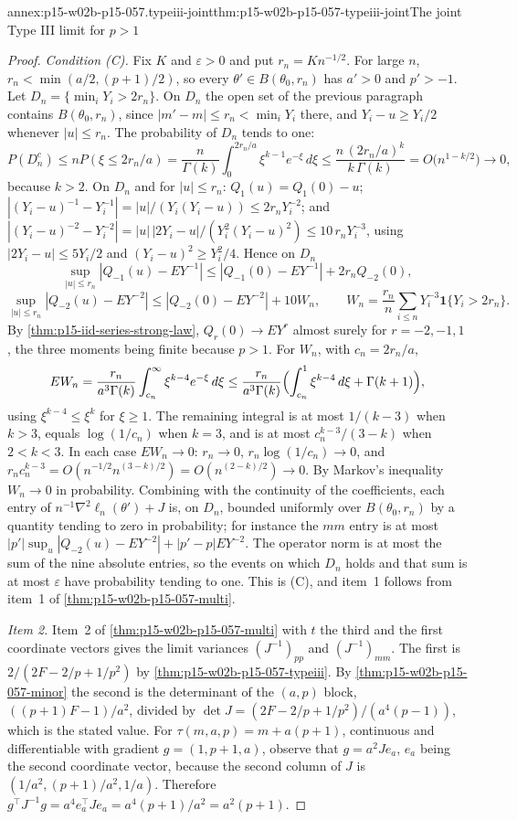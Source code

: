 \begin{annexitem}{annex:p15-w02b-p15-057.typeiii-joint}{thm:p15-w02b-p15-057-typeiii-joint}{The joint Type III limit for \(p>1\)}
\begin{proof}
\emph{Condition (C).} Fix \(K\) and \(\varepsilon>0\) and put
\(r_n=Kn^{-1/2}\). For large \(n\), \(r_n<\min(a/2,(p+1)/2)\), so every
\(\theta'\in B(\theta_0,r_n)\) has \(a'>0\) and \(p'>-1\). Let
\(D_n=\{\min_iY_i>2r_n\}\). On \(D_n\) the open set of the previous
paragraph contains \(B(\theta_0,r_n)\), since \(|m'-m|\leq r_n<\min_iY_i\)
there, and \(Y_i-u\geq Y_i/2\) whenever \(|u|\leq r_n\). The probability
of \(D_n\) tends to one:
\[
 P(D_n^c)\leq nP(\xi\leq2r_n/a)
 =\frac{n}{\Gamma(k)}\int_0^{2r_n/a}\xi^{k-1}e^{-\xi}\,d\xi
 \leq\frac{n\,(2r_n/a)^k}{k\,\Gamma(k)}
 =O\bigl(n^{1-k/2}\bigr)\to0,
\]
because \(k>2\). On \(D_n\) and for \(|u|\leq r_n\):
\(Q_1(u)=Q_1(0)-u\);
\(|(Y_i-u)^{-1}-Y_i^{-1}|=|u|/(Y_i(Y_i-u))\leq2r_nY_i^{-2}\); and
\(|(Y_i-u)^{-2}-Y_i^{-2}|=|u|\,|2Y_i-u|/(Y_i^2(Y_i-u)^2)
\leq10\,r_nY_i^{-3}\), using \(|2Y_i-u|\leq5Y_i/2\) and
\((Y_i-u)^2\geq Y_i^2/4\). Hence on \(D_n\)
\[
 \sup_{|u|\leq r_n}|Q_{-1}(u)-EY^{-1}|\leq|Q_{-1}(0)-EY^{-1}|
 +2r_nQ_{-2}(0),
\]
\[
 \sup_{|u|\leq r_n}|Q_{-2}(u)-EY^{-2}|\leq|Q_{-2}(0)-EY^{-2}|+10W_n,
 \qquad W_n=\frac{r_n}{n}\sum_{i\leq n}Y_i^{-3}\mathbf 1\{Y_i>2r_n\}.
\]
By \cref{thm:p15-iid-series-strong-law}, \(Q_r(0)\to EY^r\) almost surely
for \(r=-2,-1,1\), the three moments being finite because \(p>1\). For
\(W_n\), with \(c_n=2r_n/a\),
\[
 EW_n=\frac{r_n}{a^3\Gamma(k)}\int_{c_n}^\infty\xi^{k-4}e^{-\xi}\,d\xi
 \leq\frac{r_n}{a^3\Gamma(k)}\Bigl(\int_{c_n}^1\xi^{k-4}\,d\xi
 +\Gamma(k+1)\Bigr),
\]
using \(\xi^{k-4}\leq\xi^k\) for \(\xi\geq1\). The remaining integral is at
most \(1/(k-3)\) when \(k>3\), equals \(\log(1/c_n)\) when \(k=3\), and is
at most \(c_n^{k-3}/(3-k)\) when \(2<k<3\). In each case \(EW_n\to0\):
\(r_n\to0\), \(r_n\log(1/c_n)\to0\), and
\(r_nc_n^{k-3}=O(n^{-1/2}n^{(3-k)/2})=O(n^{(2-k)/2})\to0\). By Markov's
inequality \(W_n\to0\) in probability. Combining with the continuity of
the coefficients, each entry of \(n^{-1}\nabla^2\ell_n(\theta')+J\) is, on
\(D_n\), bounded uniformly over \(B(\theta_0,r_n)\) by a quantity tending to
zero in probability; for instance the \(mm\) entry is at most
\(|p'|\sup_u|Q_{-2}(u)-EY^{-2}|+|p'-p|EY^{-2}\). The operator norm is at
most the sum of the nine absolute entries, so the events on which
\(D_n\) holds and that sum is at most \(\varepsilon\) have probability
tending to one. This is (C), and item~1 follows from item~1 of
\cref{thm:p15-w02b-p15-057-multi}.

\emph{Item 2.} Item~2 of \cref{thm:p15-w02b-p15-057-multi} with \(t\) the
third and the first coordinate vectors gives the limit variances
\((J^{-1})_{pp}\) and \((J^{-1})_{mm}\). The first is
\(2/(2F-2/p+1/p^2)\) by \cref{thm:p15-w02b-p15-057-typeiii}. By
\cref{thm:p15-w02b-p15-057-minor} the second is the determinant of the
\((a,p)\) block, \(((p+1)F-1)/a^2\), divided by
\(\det J=(2F-2/p+1/p^2)/(a^4(p-1))\), which is the stated value. For
\(\tau(m,a,p)=m+a(p+1)\), continuous and differentiable with gradient
\(g=(1,p+1,a)\), observe that \(g=a^2Je_a\), \(e_a\) being the second
coordinate vector, because the second column of \(J\) is
\((1/a^2,(p+1)/a^2,1/a)\). Therefore
\(g^{\top}J^{-1}g=a^4e_a^{\top}Je_a=a^4(p+1)/a^2=a^2(p+1)\).


\end{proof}
\end{annexitem}
